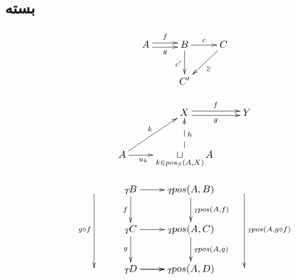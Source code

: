 %
%


\subsection{بسته }

\[
\xymatrix{
A \ar@<.5ex>[r]^f\ar@<-.5ex>[r]_g & B\ar[d]_{c'}\ar[r]^c & C\ar[ld]^{\overline{c}} \\
& C' & 
}
\]

\[
\xymatrix{
 & X\ar@<.5ex>[r]^{f}\ar@<-.5ex>[r]_{g} & Y\\
A \ar[r]_{u_k\qquad}\ar[ru]^k& \mathop{\sqcup}\limits_{k\in pos_S(A,X)}A\ar@{-->}_h[u]
}
\]

\[
\xymatrix{
\ar[dd]_{g\circ f} & _T\!B \ar[d]_{f}\ar[r] & _T\! pos(A,B)\ar[d]^{_T\! pos(A,f)} & \ar[dd]^{_T\! pos(A,g\circ f)}\\
& _T\!C\ar[r]\ar[d]_{g} & _T\! pos(A,C)\ar[d]^{_T\! pos(A,g)} & \\
& _T\!D\ar[r] \ar[r] & _T\! pos(A,D) &
}
\]


